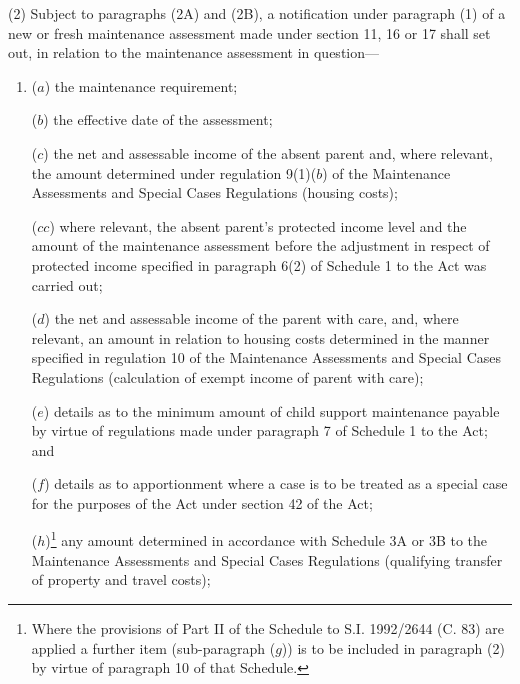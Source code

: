\documentclass[a4paper,12pt]{article}
\begin{document}
(2) 
Subject to 
  paragraphs (2A) and (2B),  %
a notification under paragraph (1)  %
of a new or fresh maintenance assessment made under section 11, 16 or 17  %
shall set out, in relation to the maintenance assessment in question—
\begin{enumerate}\item[]
($a$) the maintenance requirement;

($b$) the effective date of the assessment;


($c$) the net and assessable income of the absent parent and, where relevant, the amount determined under regulation 9(1)($b$) of the Maintenance Assessments and Special Cases Regulations (housing costs);

($cc$) where relevant, the absent parent’s protected income level and the amount of the maintenance assessment before the adjustment in respect of protected income specified in paragraph 6(2) of Schedule 1 to the Act was carried out;


($d$) the net and assessable income of the parent with care, and, where relevant, an amount in relation to housing costs determined in the manner specified in regulation 10 of the Maintenance Assessments and Special Cases Regulations (calculation of exempt income of parent with care);

($e$) details as to the minimum amount of child support maintenance payable by virtue of regulations made under paragraph 7 of Schedule 1 to the Act; and

($f$) details as to apportionment where a case is to be treated as a special case for the purposes of the Act under section 42 of the Act;

($h$)\footnote{\frenchspacing Where the provisions of Part II of the Schedule to S.I. 1992/2644 (C. 83) are applied a further item (sub-paragraph ($g$)) is to be included in paragraph (2) by virtue of paragraph 10 of that Schedule.} any amount determined in accordance with Schedule 3A or 3B to the Maintenance Assessments and Special Cases Regulations (qualifying transfer of property and travel costs);


\end{enumerate}
\end{document}
